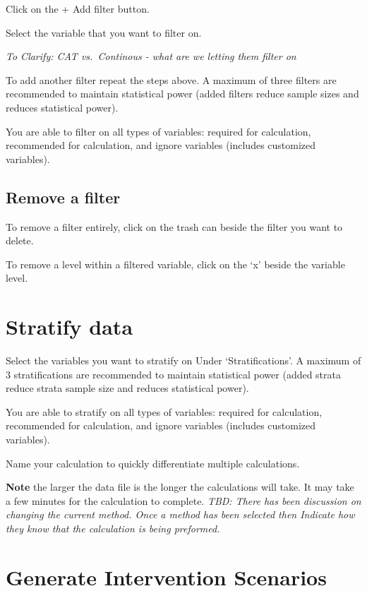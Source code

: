 \documentclass[]{book}
\begin{document}
Click on the + Add filter button.

Select the variable that you want to filter on.

\emph{To Clarify: CAT vs.~Continous - what are we letting them filter
on}

To add another filter repeat the steps above. A maximum of three filters
are recommended to maintain statistical power (added filters reduce
sample sizes and reduces statistical power).

You are able to filter on all types of variables: required for
calculation, recommended for calculation, and ignore variables (includes
customized variables).

\subsection{Remove a filter}\label{remove-a-filter}

To remove a filter entirely, click on the trash can beside the filter
you want to delete.

To remove a level within a filtered variable, click on the `x' beside
the variable level.

\section{Stratify data}\label{stratify-data}

Select the variables you want to stratify on Under `Stratifications'. A
maximum of 3 stratifications are recommended to maintain statistical
power (added strata reduce strata sample size and reduces statistical
power).

You are able to stratify on all types of variables: required for
calculation, recommended for calculation, and ignore variables (includes
customized variables).

Name your calculation to quickly differentiate multiple calculations.

\textbf{Note} the larger the data file is the longer the calculations
will take. It may take a few minutes for the calculation to complete.
\emph{TBD: There has been discussion on changing the current method.
Once a method has been selected then Indicate how they know that the
calculation is being preformed.}

\section{Generate Intervention
Scenarios}\label{generate-intervention-scenarios}
\end{document}
